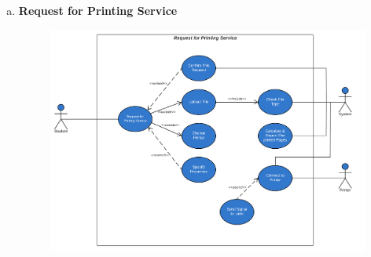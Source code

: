     \begin{enumerate}[a)]
    \item {\textbf{Request for Printing Service}}
    \begin{center}
    \begin{figure}[htp]
    \begin{center}
     \includegraphics[scale=.62]{images/Task1/requestForPrintingService.png}
    \end{center}
    \label{refhinh1}
    \end{figure}
    \end{center}


\end{enumerate}
